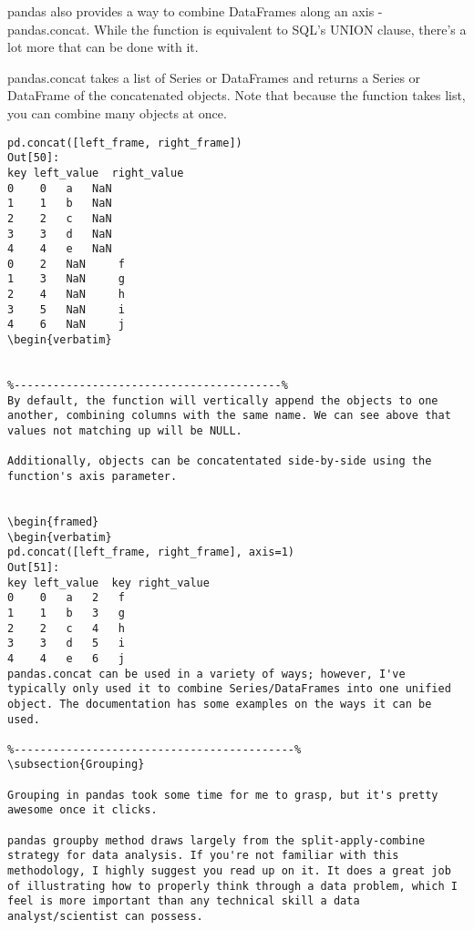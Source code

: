 \begin{framed}
\begin{framed}
\begin{framed}
\begin{framed}
\begin{framed}
\begin{framed}
\begin{framed}
\begin{framed}
\begin{framed}
\begin{framed}
\begin{framed}
\begin{framed}
\begin{framed}
\begin{framed}
\begin{framed}
\begin{framed}
\begin{framed}
pandas also provides a way to combine DataFrames along an axis - pandas.concat. While the function is equivalent to SQL's UNION clause, there's a lot more that can be done with it.

pandas.concat takes a list of Series or DataFrames and returns a Series or DataFrame of the concatenated objects. Note that because the function takes list, you can combine many objects at once.


\begin{framed}
\begin{verbatim}
pd.concat([left_frame, right_frame])
Out[50]:
key	left_value	right_value
0	 0	 a	 NaN
1	 1	 b	 NaN
2	 2	 c	 NaN
3	 3	 d	 NaN
4	 4	 e	 NaN
0	 2	 NaN	 f
1	 3	 NaN	 g
2	 4	 NaN	 h
3	 5	 NaN	 i
4	 6	 NaN	 j
\begin{verbatim}


%-----------------------------------------%
By default, the function will vertically append the objects to one another, combining columns with the same name. We can see above that values not matching up will be NULL.

Additionally, objects can be concatentated side-by-side using the function's axis parameter.


\begin{framed}
\begin{verbatim}
pd.concat([left_frame, right_frame], axis=1)
Out[51]:
key	left_value	key	right_value
0	 0	 a	 2	 f
1	 1	 b	 3	 g
2	 2	 c	 4	 h
3	 3	 d	 5	 i
4	 4	 e	 6	 j
pandas.concat can be used in a variety of ways; however, I've typically only used it to combine Series/DataFrames into one unified object. The documentation has some examples on the ways it can be used.

%-------------------------------------------%
\subsection{Grouping}

Grouping in pandas took some time for me to grasp, but it's pretty awesome once it clicks.

pandas groupby method draws largely from the split-apply-combine strategy for data analysis. If you're not familiar with this methodology, I highly suggest you read up on it. It does a great job of illustrating how to properly think through a data problem, which I feel is more important than any technical skill a data analyst/scientist can possess.


\end{verbatim}
\end{framed}
\end{framed}
\end{framed}
\end{framed}
\end{framed}
\end{framed}
\end{framed}
\end{framed}
\end{framed}
\end{framed}
\end{framed}
\end{framed}
\end{framed}
\end{framed}
\end{framed}
\end{framed}
\end{framed}
\end{framed}
